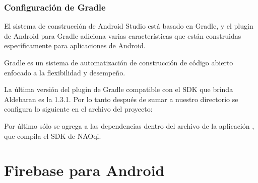 \subsubsection{Configuración de Gradle}
\label{\detokenize{dev_docs:configuracion-de-gradle}}
El sistema de construcción de Android Studio está basado en Gradle, y el plugin
de Android para Gradle adiciona varias características que están
construidas específicamente para aplicaciones de Android.\\

\begin{remark}
Gradle es un sistema de automatización de construcción de código abierto
enfocado a la flexibilidad y desempeño.
\end{remark}

La última versión del plugin de Gradle compatible con el SDK que brinda
Aldebaran es la 1.3.1. Por lo tanto después de sumar a nuestro directorio
 se configura lo siguiente en el archivo  del
proyecto:

%
\begin{sphinxVerbatim}[commandchars=\\\{\}]
 
   
     
\end{sphinxVerbatim}

Por último sólo se agrega a las dependencias dentro del archivo 
de la aplicación , que
compila el SDK de NAOqi.


\section*{ Firebase para Android}
\label{\detokenize{dev_docs:firebase-para-android}}



